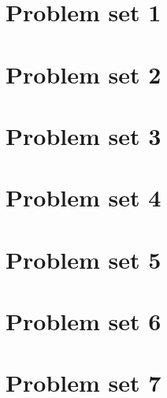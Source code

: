 \documentclass{article}
\newcommand{\addpset}[1]{
	\section{Problem set #1}
	
	\pagebreak
}
\begin{document}
\addpset{1}
\addpset{2}
\addpset{3}
\addpset{4}
\addpset{5}
\addpset{6}
\addpset{7}
\end{document}
